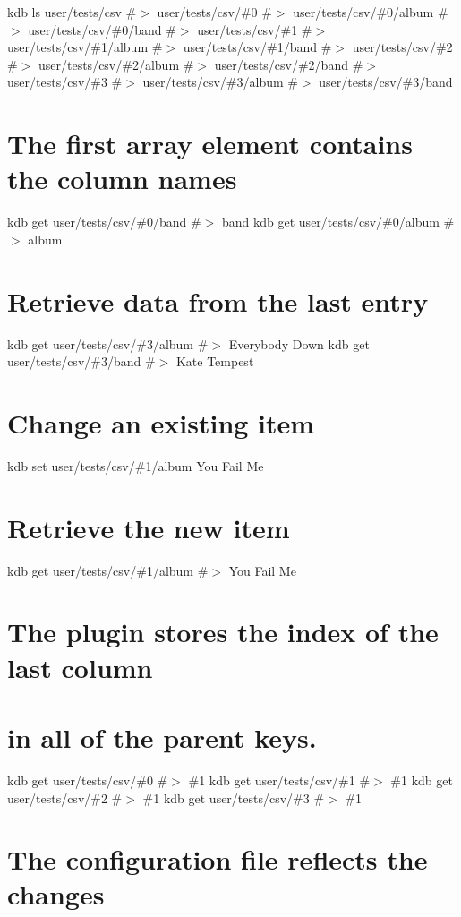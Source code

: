 kdb ls user/tests/csv \#$>$ user/tests/csv/\#0 \#$>$ user/tests/csv/\#0/album \#$>$ user/tests/csv/\#0/band \#$>$ user/tests/csv/\#1 \#$>$ user/tests/csv/\#1/album \#$>$ user/tests/csv/\#1/band \#$>$ user/tests/csv/\#2 \#$>$ user/tests/csv/\#2/album \#$>$ user/tests/csv/\#2/band \#$>$ user/tests/csv/\#3 \#$>$ user/tests/csv/\#3/album \#$>$ user/tests/csv/\#3/band\hypertarget{autotoc_md126_autotoc_md134}{}\section{The first array element contains the column names}\label{autotoc_md126_autotoc_md134}
kdb get user/tests/csv/\#0/band \#$>$ band kdb get user/tests/csv/\#0/album \#$>$ album\hypertarget{autotoc_md126_autotoc_md135}{}\section{Retrieve data from the last entry}\label{autotoc_md126_autotoc_md135}
kdb get user/tests/csv/\#3/album \#$>$ Everybody Down kdb get user/tests/csv/\#3/band \#$>$ Kate Tempest\hypertarget{autotoc_md126_autotoc_md136}{}\section{Change an existing item}\label{autotoc_md126_autotoc_md136}
kdb set user/tests/csv/\#1/album \textquotesingle{}You Fail Me\textquotesingle{} \hypertarget{autotoc_md126_autotoc_md137}{}\section{Retrieve the new item}\label{autotoc_md126_autotoc_md137}
kdb get user/tests/csv/\#1/album \#$>$ You Fail Me\hypertarget{autotoc_md126_autotoc_md138}{}\section{The plugin stores the index of the last column}\label{autotoc_md126_autotoc_md138}
\hypertarget{autotoc_md126_autotoc_md139}{}\section{in all of the parent keys.}\label{autotoc_md126_autotoc_md139}
kdb get user/tests/csv/\#0 \#$>$ \#1 kdb get user/tests/csv/\#1 \#$>$ \#1 kdb get user/tests/csv/\#2 \#$>$ \#1 kdb get user/tests/csv/\#3 \#$>$ \#1\hypertarget{autotoc_md126_autotoc_md140}{}\section{The configuration file reflects the changes}\label{autotoc_md126_autotoc_md140}
